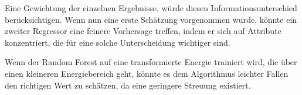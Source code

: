 Eine Gewichtung der einzelnen Ergebnisse, würde diesen Informationsunterschied berücksichtigen.
Wenn nun eine erste Schätzung vorgenommen wurde, könnte ein zweiter Regressor eine feinere Vorhersage treffen, indem er sich auf Attribute konzentriert, die
für eine solche Unterscheidung wichtiger sind.

Wenn der Random Forest auf eine transformierte Energie trainiert wird, die über einen kleineren Energiebereich geht, könnte es dem
Algorithmus leichter Fallen den richtigen Wert zu schätzen, da eine geringere Streuung existiert.
